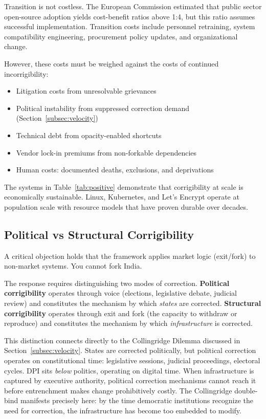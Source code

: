 Transition is not costless. The European Commission \citep{eu2021oss} estimated that public sector open-source adoption yields cost-benefit ratios above 1:4, but this ratio assumes successful implementation. Transition costs include personnel retraining, system compatibility engineering, procurement policy updates, and organizational change.

However, these costs must be weighed against the costs of continued incorrigibility:

\begin{itemize}
    \item Litigation costs from unresolvable grievances
    \item Political instability from suppressed correction demand (Section~\ref{subsec:velocity})
    \item Technical debt from opacity-enabled shortcuts
    \item Vendor lock-in premiums from non-forkable dependencies
    \item Human costs: documented deaths, exclusions, and deprivations
\end{itemize}

The systems in Table~\ref{tab:positive} demonstrate that corrigibility at scale is economically sustainable. Linux, Kubernetes, and Let's Encrypt operate at population scale with resource models that have proven durable over decades.

\subsection{Political vs Structural Corrigibility}
\label{subsec:political-structural}

A critical objection holds that the framework applies market logic (exit/fork) to non-market systems. You cannot fork India.

The response requires distinguishing two modes of correction. \textbf{Political corrigibility} operates through voice (elections, legislative debate, judicial review) and constitutes the mechanism by which \textit{states} are corrected. \textbf{Structural corrigibility} operates through exit and fork (the capacity to withdraw or reproduce) and constitutes the mechanism by which \textit{infrastructure} is corrected.

This distinction connects directly to the Collingridge Dilemma discussed in Section~\ref{subsec:velocity}. States are corrected politically, but political correction operates on constitutional time: legislative sessions, judicial proceedings, electoral cycles. DPI sits \textit{below} politics, operating on digital time. When infrastructure is captured by executive authority, political correction mechanisms cannot reach it before entrenchment makes change prohibitively costly. The Collingridge double-bind manifests precisely here: by the time democratic institutions recognize the need for correction, the infrastructure has become too embedded to modify.

